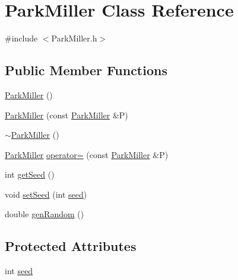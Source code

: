 \hypertarget{classParkMiller}{\section{Park\-Miller Class Reference}
\label{classParkMiller}
}


{\ttfamily \#include $<$Park\-Miller.\-h$>$}

\subsection*{Public Member Functions}
\begin{DoxyCompactItemize}
\item 
\hyperlink{classParkMiller_aa3ff1e9965841612a8b68a83b3553723}{Park\-Miller} ()
\item 
\hyperlink{classParkMiller_a31033c0208b9778481039065e3c69b4d}{Park\-Miller} (const \hyperlink{classParkMiller}{Park\-Miller} \&P)
\item 
\hyperlink{classParkMiller_a8d36ad067775b28836561f9ec844f058}{$\sim$\-Park\-Miller} ()
\item 
\hyperlink{classParkMiller}{Park\-Miller} \hyperlink{classParkMiller_a7ba3edad2f29deededee38106a3c029a}{operator=} (const \hyperlink{classParkMiller}{Park\-Miller} \&P)
\item 
int \hyperlink{classParkMiller_aad562b2b5b91bf67c78027e91ab55d2d}{get\-Seed} ()
\item 
void \hyperlink{classParkMiller_a2c878610bd1f0e06a8c91b98d63f1a40}{set\-Seed} (int \hyperlink{classParkMiller_a425ab2a4cf6f25d7749285286b3504d7}{seed})
\item 
double \hyperlink{classParkMiller_afd66989754d5fff50da023ca899dc68f}{gen\-Random} ()
\end{DoxyCompactItemize}
\subsection*{Protected Attributes}
\begin{DoxyCompactItemize}
\item 
int \hyperlink{classParkMiller_a425ab2a4cf6f25d7749285286b3504d7}{seed}
\end{DoxyCompactItemize}


